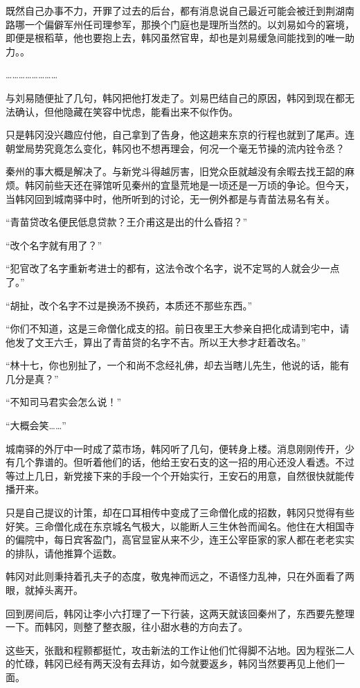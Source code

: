 既然自己办事不力，开罪了过去的后台，都有消息说自己最近可能会被迁到荆湖南路哪一个偏僻军州任司理参军，那换个门庭也是理所当然的。以刘易如今的窘境，即便是根稻草，他也要抱上去，韩冈虽然官卑，却也是刘易缓急间能找到的唯一助力。。

……………………

与刘易随便扯了几句，韩冈把他打发走了。刘易巴结自己的原因，韩冈到现在都无法确认，但他隐藏在笑容中忧虑，能看出来不似作伪。

只是韩冈没兴趣应付他，自己拿到了告身，他这趟来东京的行程也就到了尾声。连朝堂局势究竟怎么变化，韩冈也不想再理会，何况一个毫无节操的流内铨令丞？

秦州的事大概是解决了。与新党斗得越厉害，旧党众臣就越没有余暇去找王韶的麻烦。韩冈前些天还在驿馆听见秦州的宜垦荒地是一顷还是一万顷的争论。但今天，当韩冈回到城南驿中时，他所听到的讨论，无一例外都是与青苗法易名有关。

“青苗贷改名便民低息贷款？王介甫这是出的什么昏招？”

“改个名字就有用了？”

“犯官改了名字重新考进士的都有，这法令改个名字，说不定骂的人就会少一点了。”

“胡扯，改个名字不过是换汤不换药，本质还不那些东西。”

“你们不知道，这是三命僧化成支的招。前日夜里王大参亲自把化成请到宅中，请他发了文王六壬，算出了青苗贷的名字不吉。所以王大参才赶着改名。”

“林十七，你也别扯了，一个和尚不念经礼佛，却去当瞎儿先生，他说的话，能有几分是真？”

“不知司马君实会怎么说！”

“大概会笑……”

城南驿的外厅中一时成了菜市场，韩冈听了几句，便转身上楼。消息刚刚传开，少有几个靠谱的。但听着他们的话，他给王安石支的这一招的用心还没人看透。不过等过上几日，新党接下来的手段一个个开始实行，王安石的用意，自然很快就能传播开来。

只是自己提议的计策，却在口耳相传中变成了三命僧化成的招数，韩冈只觉得有些好笑。三命僧化成在东京城名气极大，以能断人三生休咎而闻名。他住在大相国寺的偏院中，每日宾客盈门，高官显宦从来不少，连王公宰臣家的家人都在老老实实的排队，请他推算个运数。

韩冈对此则秉持着孔夫子的态度，敬鬼神而远之，不语怪力乱神，只在外面看了两眼，就掉头离开。

回到房间后，韩冈让李小六打理了一下行装，这两天就该回秦州了，东西要先整理一下。而韩冈，则整了整衣服，往小甜水巷的方向去了。

这些天，张戬和程颢都挺忙，攻击新法的工作让他们忙得脚不沾地。因为程张二人的忙碌，韩冈已经有两天没有去拜访，如今就要返乡，韩冈当然要再见上他们一面。

